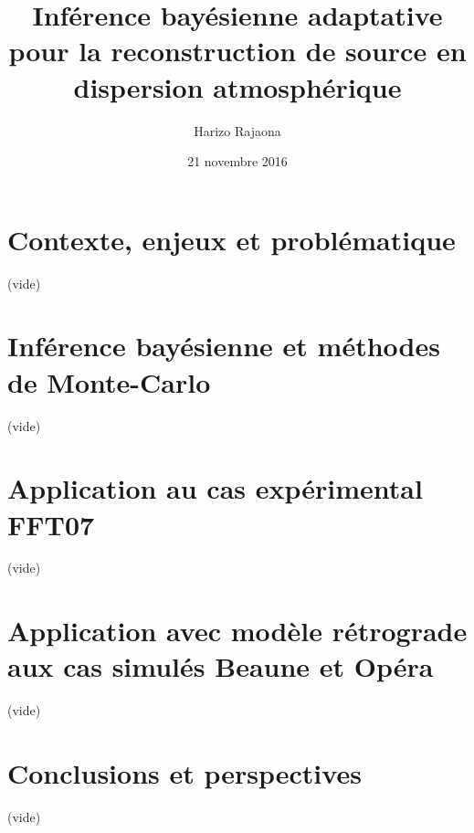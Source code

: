\documentclass{beamer}
\title{Inférence bayésienne adaptative pour la reconstruction de source en dispersion atmosphérique}
\author{Harizo Rajaona}
\institute{CrisTaL - CEA - Aria Technologies}
\date{21 novembre 2016}
\begin{document}
\AtBeginSection[]
{
	\begin{frame}
		\tableofcontents[currentsection]
	\end{frame}
}
	
	
\begin{frame}
	\titlepage
\end{frame}
\begin{frame}
	\tableofcontents
\end{frame}
\section{Contexte, enjeux et problématique}

\begin{frame}
	(vide)
\end{frame}
\section{Inférence bayésienne et méthodes de Monte-Carlo}
\begin{frame}
	(vide)
\end{frame}
\section{Application au cas expérimental FFT07}
\begin{frame}
	(vide)
\end{frame}
\section{Application avec modèle rétrograde aux cas simulés Beaune et Opéra}
\begin{frame}
	(vide)
\end{frame}
\section{Conclusions et perspectives}
\begin{frame}
	(vide)
\end{frame}
\end{document}
